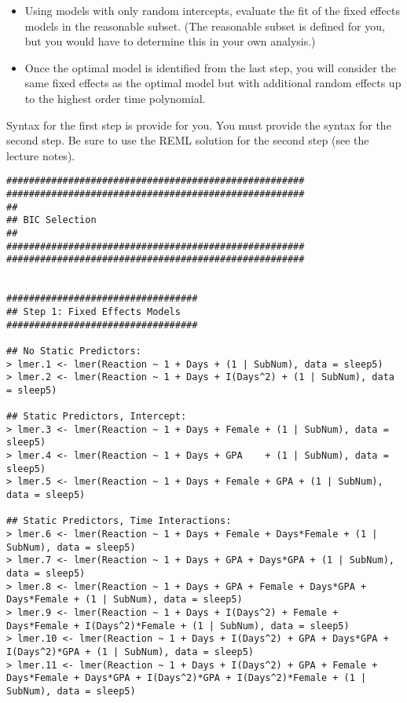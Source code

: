 \documentclass[]{article}
\begin{document}
\begin{itemize}
\item Using models with only random intercepts, evaluate the fit of the fixed effects models in the reasonable subset. (The reasonable subset is defined for you, but you would have to determine this in your own analysis.)
\item Once the optimal model is identified from the last step, you will consider the same fixed effects as the optimal model but with additional  random effects up to the highest order time polynomial.
\end{itemize}

\noindent Syntax for the first step is provide for you. You must provide the syntax for the second step. Be
sure to use the REML solution for the second step (see the lecture notes).

\begin{shaded}
\begin{lstlisting}
#####################################################
#####################################################
##
## BIC Selection
##
#####################################################
#####################################################


##################################
## Step 1: Fixed Effects Models
##################################

## No Static Predictors:
> lmer.1 <- lmer(Reaction ~ 1 + Days + (1 | SubNum), data = sleep5)
> lmer.2 <- lmer(Reaction ~ 1 + Days + I(Days^2) + (1 | SubNum), data = sleep5)

## Static Predictors, Intercept:
> lmer.3 <- lmer(Reaction ~ 1 + Days + Female + (1 | SubNum), data = sleep5)
> lmer.4 <- lmer(Reaction ~ 1 + Days + GPA    + (1 | SubNum), data = sleep5)
> lmer.5 <- lmer(Reaction ~ 1 + Days + Female + GPA + (1 | SubNum), data = sleep5)

## Static Predictors, Time Interactions:
> lmer.6 <- lmer(Reaction ~ 1 + Days + Female + Days*Female + (1 | SubNum), data = sleep5)
> lmer.7 <- lmer(Reaction ~ 1 + Days + GPA + Days*GPA + (1 | SubNum), data = sleep5)
> lmer.8 <- lmer(Reaction ~ 1 + Days + GPA + Female + Days*GPA + Days*Female + (1 | SubNum), data = sleep5)
> lmer.9 <- lmer(Reaction ~ 1 + Days + I(Days^2) + Female + Days*Female + I(Days^2)*Female + (1 | SubNum), data = sleep5)
> lmer.10 <- lmer(Reaction ~ 1 + Days + I(Days^2) + GPA + Days*GPA + I(Days^2)*GPA + (1 | SubNum), data = sleep5)
> lmer.11 <- lmer(Reaction ~ 1 + Days + I(Days^2) + GPA + Female + Days*Female + Days*GPA + I(Days^2)*GPA + I(Days^2)*Female + (1 | SubNum), data = sleep5)
\end{lstlisting}
\end{shaded}
\end{document}
